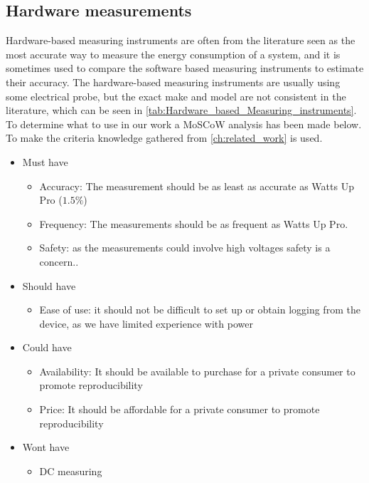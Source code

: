 \subsection{Hardware measurements}\label{sec:clampIntro}
Hardware-based measuring instruments are often from the literature seen as the most accurate way to measure the energy consumption of a system, and it is sometimes used to compare the software based measuring instruments to estimate their accuracy\cite{fahad2019comparative}. The hardware-based measuring instruments are usually using some electrical probe, but the exact make and model are not consistent in the literature, which can be seen in \cref{tab:Hardware_based_Measuring_instruments}.
To determine what to use in our work a MoSCoW analysis has been made below. To make the criteria knowledge gathered from \cref{ch:related_work} is used.

\begin{itemize}
    \item Must have
    \begin{itemize}
        \item Accuracy: The measurement should be as least as accurate as Watts Up Pro ($1.5\%$)
        \item Frequency: The measurements should be as frequent as Watts Up Pro.
        \item Safety: as the measurements could involve high voltages safety is a concern.\cite{sik}.
    \end{itemize}
    \item Should have
    \begin{itemize}
        \item Ease of use: it should not be difficult to set up or obtain logging from the device, as we have limited experience with power
    \end{itemize}
    \item Could have
    \begin{itemize}
        \item Availability: It should be available to purchase for a private consumer to promote reproducibility
        \item Price: It should be affordable for a private consumer to promote reproducibility 
    \end{itemize}
    \item Wont have
    \begin{itemize}
        \item DC measuring
    \end{itemize}
\end{itemize}

